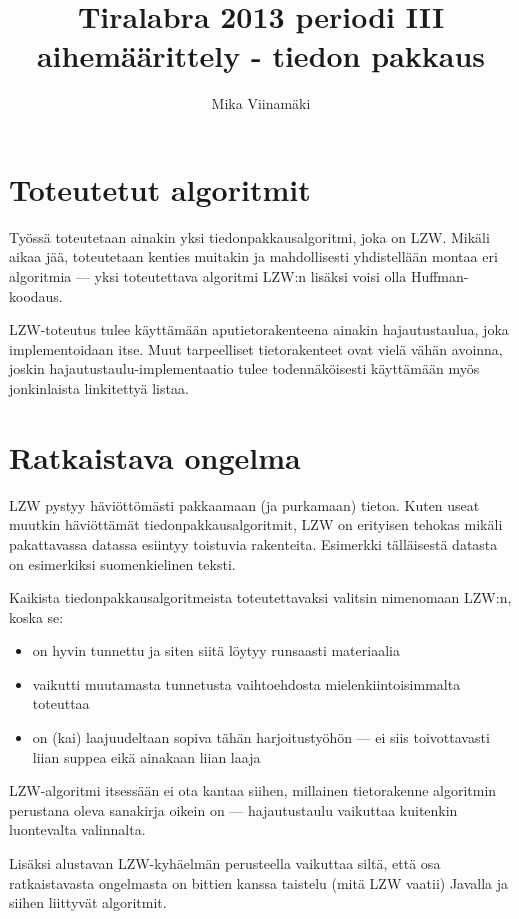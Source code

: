 \documentclass{article}
\begin{document}
\title{Tiralabra 2013 periodi III aihemäärittely - tiedon pakkaus}
\author{Mika Viinamäki}
\maketitle

\section{Toteutetut algoritmit}
Työssä toteutetaan ainakin yksi tiedonpakkausalgoritmi, joka on LZW. Mikäli aikaa jää, toteutetaan kenties muitakin ja mahdollisesti yhdistellään montaa eri algoritmia --- yksi toteutettava algoritmi LZW:n lisäksi voisi olla Huffman-koodaus.

LZW-toteutus tulee käyttämään aputietorakenteena ainakin hajautustaulua, joka implementoidaan itse. Muut tarpeelliset tietorakenteet ovat vielä vähän avoinna, joskin hajautustaulu-implementaatio tulee todennäköisesti käyttämään myös jonkinlaista linkitettyä listaa.

\section{Ratkaistava ongelma}
LZW pystyy häviöttömästi pakkaamaan (ja purkamaan) tietoa. Kuten useat muutkin häviöttämät tiedonpakkausalgoritmit, LZW on erityisen tehokas mikäli pakattavassa datassa esiintyy toistuvia rakenteita. Esimerkki tälläisestä datasta on esimerkiksi suomenkielinen teksti.

Kaikista tiedonpakkausalgoritmeista toteutettavaksi valitsin nimenomaan LZW:n, koska se:
\begin{itemize}
    \item on hyvin tunnettu ja siten siitä löytyy runsaasti materiaalia
    \item vaikutti muutamasta tunnetusta vaihtoehdosta mielenkiintoisimmalta toteuttaa
    \item on (kai) laajuudeltaan sopiva tähän harjoitustyöhön --- ei siis toivottavasti liian suppea eikä ainakaan liian laaja
\end{itemize}

LZW-algoritmi itsessään ei ota kantaa siihen, millainen tietorakenne algoritmin perustana oleva sanakirja oikein on --- hajautustaulu vaikuttaa kuitenkin luontevalta valinnalta.

Lisäksi alustavan LZW-kyhäelmän perusteella vaikuttaa siltä, että osa ratkaistavasta ongelmasta on bittien kanssa taistelu (mitä LZW vaatii) Javalla ja siihen liittyvät algoritmit.
\end{document}
